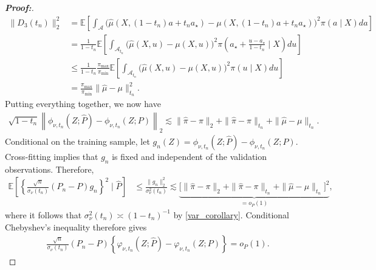 \documentclass[11pt,twoside]{article}
\theoremstyle{definition}
\theoremstyle{remark}
\begin{document}
\begin{proof}[\textbf{Proof:}]
\begin{align*}
    \|D_3(t_n)\|_2^2 &= \mathbb{E}\left[ \int_{\mathcal{A}} \Big( \widehat{\mu}(X, (1-t_n)a + t_n a_{\star}) - \mu(X, (1-t_n)a + t_n a_{\star}) \Big)^2 \pi(a\mid X)da \right]\\
    &= \frac{1}{1-t_n} \mathbb{E}\left[ \int_{\mathcal{A}_{t_n}}\Big( \widehat{\mu}(X, u) - \mu(X,u) \Big)^2 \pi\left(a_{\star} + \frac{u-a_{\star}}{1-t_n}\mid X\right)du \right] \\
    &\leq \frac{1}{1-t_n} \frac{\pi_{\max}}{\pi_{\min}} \mathbb{E}\left[ \int_{\mathcal{A}_{t_n}}\Big( \widehat{\mu}(X, u) - \mu(X,u) \Big)^2 \pi\left(u\mid X\right)du \right] \\
    &=\frac{\pi_{\max}}{\pi_{\min}} \|\widehat\mu-\mu\|_{t_n}^2.
\end{align*}
Putting everything together, we now have 
\begin{align*}
    \sqrt{1 - t_n} \left\| \phi_{\nu, t_n}(Z; \widehat{P}) - \phi_{\nu, t_n}(Z; P) \right\|_2  \lesssim \|\widehat\pi-\pi\|_{2} + \|\widehat\pi-\pi\|_{t_n} + \|\widehat{\mu}-\mu\|_{t_n}.
\end{align*}
Conditional on the training sample, let $  g_n(Z) = \phi_{\nu, t_n}(Z; \widehat{P}) - \phi_{\nu, t_n}(Z; P)$. Cross-fitting implies that $g_n$ is fixed and independent of the validation observations. Therefore,
\begin{align*}
    \mathbb{E}\left[\left\{ \frac{\sqrt n}{\sigma_{\nu}(t_n)} (P_n-P)g_n \right\}^2 \mid  \widehat{P} \right] &\leq \frac{\|g_n\|_2^2}{\sigma^2_{\nu}(t_n)} \lesssim \underbrace{\Big[ \| \widehat\pi-\pi \|_{2} + \|\widehat\pi - \pi\|_{t_n} + \|\widehat\mu-\mu\|_{t_n} \Big]^2}_{=o_P(1)},
\end{align*}
where it follows that $\sigma^2_{\nu}(t_n) \asymp (1-t_n)^{-1}$ by \cref{var_corollary}. Conditional Chebyshev's inequality therefore gives
\begin{align*}
    \frac{\sqrt n}{\sigma_{\nu}(t_n)} (P_n-P) \left\{ \varphi_{\nu, t_n}(Z; \widehat{P}) - \varphi_{\nu, t_n}(Z; P) \right\} = o_P(1).
\end{align*}

\bigskip


\end{proof}
\end{document}
